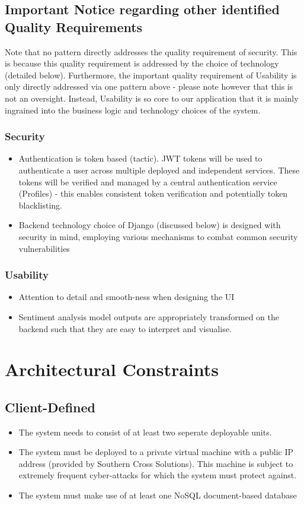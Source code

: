 \documentclass[12pt]{article}
\begin{document}
\subsection{Important Notice regarding other identified Quality Requirements}
Note that no pattern directly addresses the quality requirement of security. This is because this quality requirement is addressed by the choice of technology (detailed below). Furthermore, the important quality requirement of Usability is only directly addressed via one pattern above - please note however that this is not an oversight. Instead, Usability is so core to our application that it is mainly ingrained into the business logic and technology choices of the system.
\subsubsection{Security}
\begin{itemize}
    \item Authentication is token based (tactic). JWT tokens will be used to authenticate a user across multiple deployed and independent services. These tokens will be verified and managed by a central authentication service (Profiles) - this enables consistent token verification and potentially token blacklisting.
    \item Backend technology choice of Django (discussed below) is designed with security in mind, employing various mechanisms to combat common security vulnerabilities
\end{itemize}
\subsubsection{Usability}
\begin{itemize}
    \item Attention to detail and smooth-ness when designing the UI
    \item Sentiment analysis model outputs are appropriately transformed on the backend such that they are easy to interpret and visualise.
\end{itemize}


\newpage
\section{Architectural Constraints}
\subsection{Client-Defined}
\begin{itemize}
    \item The system needs to consist of at least two seperate deployable units.
    \item The system must be deployed to a private virtual machine with a public IP address (provided by Southern Cross Solutions). This machine is subject to extremely frequent cyber-attacks for which the system must protect against.
    \item The system must make use of at least one NoSQL document-based database
\end{itemize}
\end{document}
